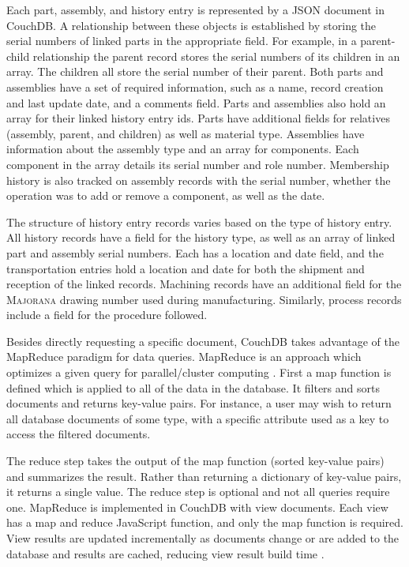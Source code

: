 \documentclass[journal]{IEEEtran}
\begin{document}
Each part, assembly, and history entry is represented by a JSON document in CouchDB. A relationship between these objects
is established by storing the serial numbers of linked parts in the appropriate field. For example, in a parent-child relationship the parent record stores the serial numbers
of its children in an array. The children all store the serial number of their parent. Both parts and assemblies have a set of 
required information, such as a name, record creation and last update date, and a comments field. Parts and assemblies also hold an array for
their linked history entry ids. 
Parts have additional fields for relatives (assembly, parent, and children) as well as material type. Assemblies have information
about the assembly type and an array for components. Each component in the array details its serial number and role number. Membership history is also tracked
on assembly records with the serial number, whether the operation was to add or remove a component, as well as the date.

The structure of history entry records varies based on the type of history entry. All history records have a field for the history type,
as well as an array of linked part and assembly serial numbers. Each has a location and date field, and the transportation entries
hold a location and date for both the shipment and reception of the linked records. Machining records have an additional field for the
\textsc{Majorana} drawing number used during manufacturing. Similarly, process records include a field for the procedure followed.

Besides directly requesting a specific document, CouchDB takes advantage of the MapReduce paradigm for data
queries. MapReduce is an approach which optimizes a given query for parallel/cluster computing \cite{mapreduce_dean}. First a map function
is defined which is applied to all of the data in the database. It filters and sorts documents and returns key-value
pairs. For instance, a user may wish to return all database documents of some type, with a specific attribute used as
a key to access the filtered documents. 

The reduce step takes the output of the map function (sorted key-value pairs) and summarizes the result. Rather than returning a dictionary
of key-value pairs, it returns a single value. The reduce
step is optional and not all queries require one. MapReduce is implemented in CouchDB with view documents. Each view has
a map and reduce JavaScript function, and only the map function is required. View results are updated incrementally as
documents change or are added to the database and results are cached, reducing view result build time \cite{couchdb_guide}.
\end{document}
